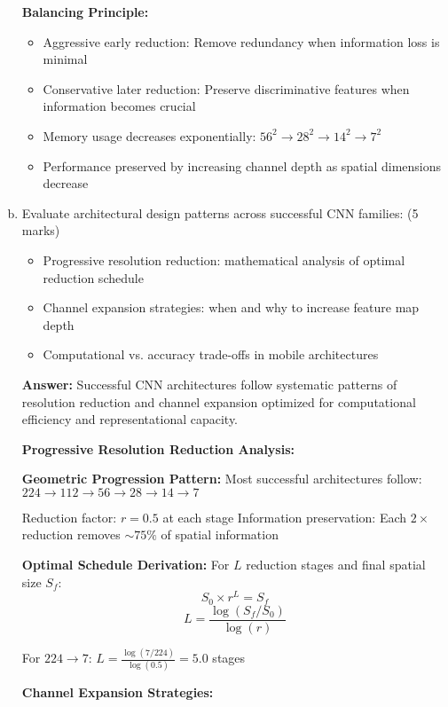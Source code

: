 \documentclass[12pt]{article}
\newcommand{\answer}[1]{{\color{answercolor}\textbf{Answer:} #1}}
\newcommand{\explanation}[1]{{\color{explanationcolor}#1}}
\begin{document}
\begin{enumerate}[(a)]
{    \textbf{Balancing Principle:}
    \begin{itemize}
        \item Aggressive early reduction: Remove redundancy when information loss is minimal
        \item Conservative later reduction: Preserve discriminative features when information becomes crucial
        \item Memory usage decreases exponentially: $56^2 \rightarrow 28^2 \rightarrow 14^2 \rightarrow 7^2$
        \item Performance preserved by increasing channel depth as spatial dimensions decrease
    \end{itemize}
    }
    
    \item Evaluate architectural design patterns across successful CNN families: \hfill (5 marks)
    \begin{itemize}
        \item Progressive resolution reduction: mathematical analysis of optimal reduction schedule
        \item Channel expansion strategies: when and why to increase feature map depth
        \item Computational vs. accuracy trade-offs in mobile architectures
    \end{itemize}
    
    \answer{Successful CNN architectures follow systematic patterns of resolution reduction and channel expansion optimized for computational efficiency and representational capacity.}
    
    \explanation{
    \textbf{Progressive Resolution Reduction Analysis:}
    
    \textbf{Geometric Progression Pattern:}
    Most successful architectures follow: $224 \rightarrow 112 \rightarrow 56 \rightarrow 28 \rightarrow 14 \rightarrow 7$
    
    Reduction factor: $r = 0.5$ at each stage
    Information preservation: Each $2 \times$ reduction removes $\sim 75\%$ of spatial information
    
    \textbf{Optimal Schedule Derivation:}
    For $L$ reduction stages and final spatial size $S_f$:
    $$S_0 \times r^L = S_f$$
    $$L = \frac{\log(S_f/S_0)}{\log(r)}$$
    
    For $224 \rightarrow 7$: $L = \frac{\log(7/224)}{\log(0.5)} = 5.0$ stages
    
    \textbf{Channel Expansion Strategies:}
    
}
\end{enumerate}
\end{document}
